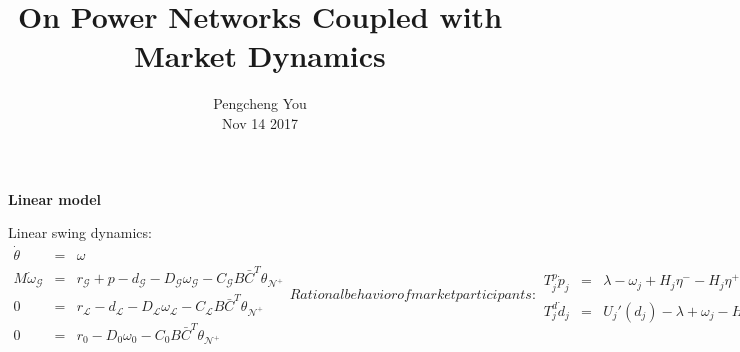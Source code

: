 \documentclass[journal,12pt,onecolumn,draftclsnofoot]{IEEEtran}
\begin{document}
\title{\Large On Power Networks Coupled with Market Dynamics}


\author{Pengcheng You \\  Nov 14 2017%
}


\maketitle


%

%
%


\IEEEpeerreviewmaketitle


     

\textbf{Linear model}

Linear swing dynamics:
  \begin{subequations}
  	\begin{eqnarray}
  	\label{eq:nwdymvec:1}
  	\dot \theta 	& = &  \omega \\
  	\label{eq:nwdymvec:2}
  	M \dot \omega_\mathcal{G} & = & r_\mathcal{G} +p  - d_\mathcal{G}  -D_\mathcal{G}  \omega_\mathcal{G}  - C_{\mathcal{G}}B  \bar C^T \theta_{\mathcal{N}^+} \\
  	\label{eq:nwdymvec:3}
  	0 & = & r_{\mathcal{L}} - d_{\mathcal{L}}  -D_{\mathcal{L}} \omega_{\mathcal{L}} - C_{\mathcal{L}}B \bar C^T\theta_{\mathcal{N}^+} \\
  	\label{eq:nwdymvec:4}
    0 & = & r_0 -D_0 \omega_0 - C_0 B \bar C^T\theta_{\mathcal{N}^+} 
    \end{eqnarray}
    
Rational behavior of market participants:
    \begin{eqnarray}
  	\label{eq:nwdymvec:5}
  	T^p_j \dot p_j & =  & \lambda -  \omega_j   +  H_j \eta^- - H_j \eta^+ - J_j'(p_j)     \\
  	\label{eq:nwdymvec:6}
  	T^d_j \dot d_j & =  & U_j'(d_j) -  \lambda +  \omega_j - H_j \eta^- +  H_j\eta^+    
  	\end{eqnarray}\label{eq:nwdymvec}%
  \end{subequations}
\end{document}
